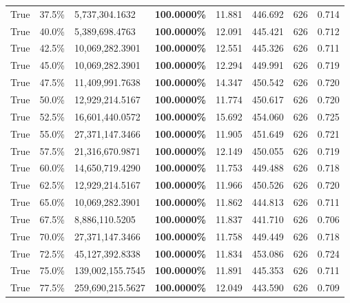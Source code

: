 \begin{table}[H]
\begin{tabular}{lllrllll}
\cline{1-8}
True & 37.5\% & 5,737,304.1632 & \bfseries \color{red} 100.0000\% & 11.881 & 446.692 & 626 & 0.714 \\
\cline{1-8}
True & 40.0\% & 5,389,698.4763 & \bfseries \color{red} 100.0000\% & 12.091 & 445.421 & 626 & 0.712 \\
\cline{1-8}
True & 42.5\% & 10,069,282.3901 & \bfseries \color{red} 100.0000\% & 12.551 & 445.326 & 626 & 0.711 \\
\cline{1-8}
True & 45.0\% & 10,069,282.3901 & \bfseries \color{red} 100.0000\% & 12.294 & 449.991 & 626 & 0.719 \\
\cline{1-8}
True & 47.5\% & 11,409,991.7638 & \bfseries \color{red} 100.0000\% & 14.347 & 450.542 & 626 & 0.720 \\
\cline{1-8}
True & 50.0\% & 12,929,214.5167 & \bfseries \color{red} 100.0000\% & 11.774 & 450.617 & 626 & 0.720 \\
\cline{1-8}
True & 52.5\% & 16,601,440.0572 & \bfseries \color{red} 100.0000\% & 15.692 & 454.060 & 626 & 0.725 \\
\cline{1-8}
True & 55.0\% & 27,371,147.3466 & \bfseries \color{red} 100.0000\% & 11.905 & 451.649 & 626 & 0.721 \\
\cline{1-8}
True & 57.5\% & 21,316,670.9871 & \bfseries \color{red} 100.0000\% & 12.149 & 450.055 & 626 & 0.719 \\
\cline{1-8}
True & 60.0\% & 14,650,719.4290 & \bfseries \color{red} 100.0000\% & 11.753 & 449.488 & 626 & 0.718 \\
\cline{1-8}
True & 62.5\% & 12,929,214.5167 & \bfseries \color{red} 100.0000\% & 11.966 & 450.526 & 626 & 0.720 \\
\cline{1-8}
True & 65.0\% & 10,069,282.3901 & \bfseries \color{red} 100.0000\% & 11.862 & 444.813 & 626 & 0.711 \\
\cline{1-8}
True & 67.5\% & 8,886,110.5205 & \bfseries \color{red} 100.0000\% & 11.837 & 441.710 & 626 & 0.706 \\
\cline{1-8}
True & 70.0\% & 27,371,147.3466 & \bfseries \color{red} 100.0000\% & 11.758 & 449.449 & 626 & 0.718 \\
\cline{1-8}
True & 72.5\% & 45,127,392.8338 & \bfseries \color{red} 100.0000\% & 11.834 & 453.086 & 626 & 0.724 \\
\cline{1-8}
True & 75.0\% & 139,002,155.7545 & \bfseries \color{red} 100.0000\% & 11.891 & 445.353 & 626 & 0.711 \\
\cline{1-8}
True & 77.5\% & 259,690,215.5627 & \bfseries \color{red} 100.0000\% & 12.049 & 443.590 & 626 & 0.709 \\

\end{tabular}
\end{table}
